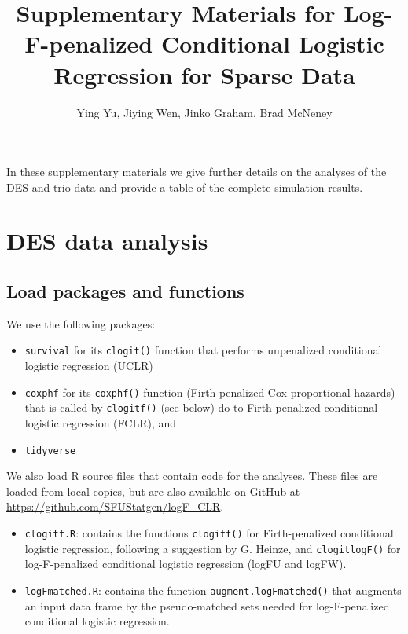 \documentclass[
]{article}
\title{Supplementary Materials for Log-F-penalized Conditional Logistic
Regression for Sparse Data}
\author{Ying Yu, Jiying Wen, Jinko Graham, Brad McNeney}
\date{}
\providecommand{\tightlist}{%
  \setlength{\itemsep}{0pt}\setlength{\parskip}{0pt}}
\begin{document}
\maketitle

In these supplementary materials we give further details on the analyses
of the DES and trio data and provide a table of the complete simulation
results.

\section{DES data analysis}\label{des-data-analysis}

\subsection{Load packages and
functions}\label{load-packages-and-functions}

We use the following packages:

\begin{itemize}
\tightlist
\item
  \texttt{survival} for its \texttt{clogit()} function that performs
  unpenalized conditional logistic regression (UCLR)
\item
  \texttt{coxphf} for its \texttt{coxphf()} function (Firth-penalized
  Cox proportional hazards) that is called by \texttt{clogitf()} (see
  below) do to Firth-penalized conditional logistic regression (FCLR),
  and
\item
  \texttt{tidyverse}
\end{itemize}

We also load R source files that contain code for the analyses. These
files are loaded from local copies, but are also available on GitHub at
\url{https://github.com/SFUStatgen/logF_CLR}.

\begin{itemize}
\tightlist
\item
  \texttt{clogitf.R}: contains the functions \texttt{clogitf()} for
  Firth-penalized conditional logistic regression, following a
  suggestion by G. Heinze, and \texttt{clogitlogF()} for log-F-penalized
  conditional logistic regression (logFU and logFW).
\item
  \texttt{logFmatched.R}: contains the function
  \texttt{augment.logFmatched()} that augments an input data frame by
  the pseudo-matched sets needed for log-F-penalized conditional
  logistic regression.
\end{itemize}
\end{document}
